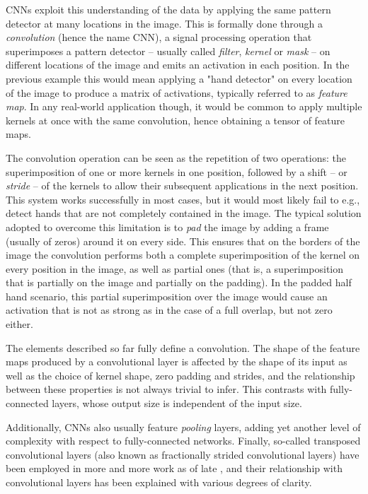 CNNs exploit this understanding of the data by applying the same pattern
detector at many locations in the image. This is formally done through a
\emph{convolution} (hence the name CNN), a signal processing operation that
superimposes a pattern detector -- usually called \emph{filter}, \emph{kernel}
or \emph{mask} -- on different locations of the image and emits an activation
in each position. In the previous example this would mean applying a "hand
detector" on every location of the image to produce a matrix of activations,
typically referred to as \emph{feature map}. In any real-world application
though, it would be common to apply multiple kernels at once with the same
convolution, hence obtaining a tensor of feature maps.

The convolution operation can be seen as the repetition of two operations: the
superimposition of one or more kernels in one position, followed by a shift --
or \emph{stride} -- of the kernels to allow their subsequent applications in
the next position. This system works successfully in most cases, but it would
most likely fail to e.g., detect hands that are not completely contained in the
image. The typical solution adopted to overcome this limitation is to
\emph{pad} the image by adding a frame (usually of zeros) around it on every
side. This ensures that on the borders of the image the convolution performs
both a complete superimposition of the kernel on every position in the image,
as well as partial ones (that is, a superimposition that is partially on the
image and partially on the padding).  In the padded half hand scenario, this
partial superimposition over the image would cause an activation that is not as
strong as in the case of a full overlap, but not zero either.

The elements described so far fully define a convolution. The shape of the
feature maps produced by a convolutional layer is affected by the shape of its
input as well as the choice of kernel shape, zero padding and strides, and the
relationship between these properties is not always trivial to infer. This
contrasts with fully-connected layers, whose output size is independent of the
input size.

Additionally, CNNs also usually feature {\em pooling\/} layers, adding yet
another level of complexity with respect to fully-connected networks. Finally,
so-called transposed convolutional layers (also known as fractionally strided
convolutional layers) have been employed in more and more work as of late
\citep{zeiler2011adaptive,zeiler2014visualizing,
long2015fully,radford2015unsupervised,Visin_2016_CVPR_Workshops,
im2016generating}, and their relationship with convolutional layers has been
explained with various degrees of clarity.

